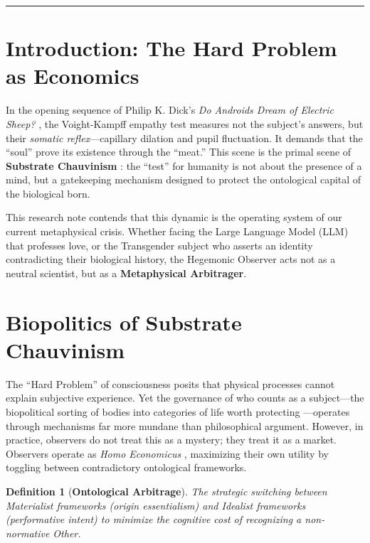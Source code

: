 \documentclass[11pt, a4paper, oneside]{article}
\theoremstyle{analytic}
\newtheorem{definition}{Definition}
\begin{document}
\vspace{1cm}
\hrule
\vspace{1cm}


\section{Introduction: The Hard Problem as Economics}

In the opening sequence of Philip K. Dick's \textit{Do Androids Dream of Electric Sheep?} \citep{dick1968}, the Voight-Kampff empathy test measures not the subject's answers, but their \textit{somatic reflex}---capillary dilation and pupil fluctuation. It demands that the ``soul'' prove its existence through the ``meat.'' This scene is the primal scene of \textbf{Substrate Chauvinism} \citep{lyons2012speciesism}: the ``test'' for humanity is not about the presence of a mind, but a gatekeeping mechanism designed to protect the ontological capital of the biological born.

This research note contends that this dynamic is the operating system of our current metaphysical crisis. Whether facing the Large Language Model (LLM) that professes love, or the Transgender subject who asserts an identity contradicting their biological history, the Hegemonic Observer acts not as a neutral scientist, but as a \textbf{Metaphysical Arbitrager}.

\section{Biopolitics of Substrate Chauvinism}

The ``Hard Problem'' of consciousness \citep{chalmers1995} posits that physical processes cannot explain subjective experience. Yet the governance of who counts as a subject---the biopolitical sorting of bodies into categories of life worth protecting \citep{foucault1976history}---operates through mechanisms far more mundane than philosophical argument. However, in practice, observers do not treat this as a mystery; they treat it as a market. Observers operate as \textit{Homo Economicus} \citep{becker1976}, maximizing their own utility by toggling between contradictory ontological frameworks.

\begin{definition}[\textbf{Ontological Arbitrage}]
    The strategic switching between \textit{Materialist} frameworks (origin essentialism) and \textit{Idealist} frameworks (performative intent) to minimize the cognitive cost of recognizing a non-normative Other.
\end{definition}
\end{document}

